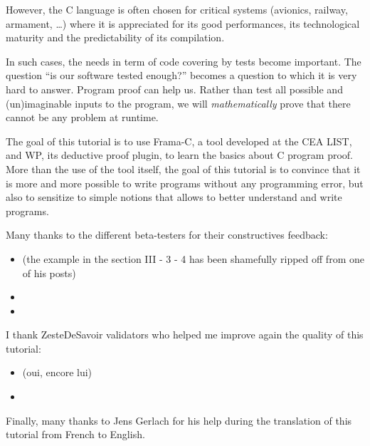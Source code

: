 However, the C language is often chosen for critical systems (avionics,
railway, armament, \ldots{}) where it is appreciated for its good
performances, its technological maturity and the predictability of its
compilation.



In such cases, the needs in term of code covering by tests become
important. The question ``is our software tested enough?'' becomes a
question to which it is very hard to answer. Program proof can help us.
Rather than test all possible and (un)imaginable inputs to the program,
we will \emph{mathematically} prove that there cannot be any problem at
runtime.



The goal of this tutorial is to use Frama-C, a tool developed at the CEA
LIST, and WP, its deductive proof plugin, to learn the basics about C
program proof. More than the use of the tool itself, the goal of this
tutorial is to convince that it is more and more possible to write
programs without any programming error, but also to sensitize to simple
notions that allows to better understand and write programs.



\begin{Information}
  Many thanks to the different beta-testers for their constructives
  feedback:

\begin{itemize}
\item {} (the
    example in the section III - 3 - 4 has been shamefully ripped
    off from one of his posts)
\item {}
\item {}
\end{itemize}
  I thank ZesteDeSavoir validators who helped me improve again the quality of
  this tutorial:

\begin{itemize}
\item {} (oui, encore lui)
\item {}
\end{itemize}
  Finally, many thanks to Jens Gerlach for his help during the translation of
  this tutorial from French to English.
\end{Information}
